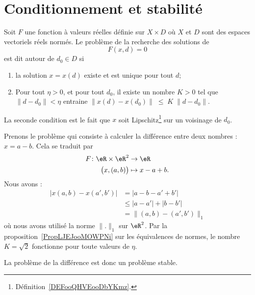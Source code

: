 \section{Conditionnement et stabilité}

\begin{definition}      \label{DEFooYIFAooSJbMkC}
	Soit \( F\) une fonction à valeurs réelles définie sur \( X\times D\) où \( X\) et \( D\) sont des espaces vectoriels réels normés. Le problème de la recherche des solutions de
	\begin{equation}
		F(x,d)=0
	\end{equation}
	est dit  autour de \( d_0\in D\) si
	\begin{enumerate}
		\item
		      la solution \( x=x(d)\) existe et est unique pour tout \( d\);
		\item \label{ItemProbStableB}
		      Pour tout \( \eta>0\), et pour tout \( d_0\), il existe un nombre \( K>0\) tel que \( \| d-d_0\|<\eta\) entraine \( \|x(d)-x(d_0)\|\;\leq\;K\;\|d-d_0\|\).
	\end{enumerate}
	La seconde condition est le fait que \( x\) soit Lipschitz\footnote{Définition~\ref{DEFooQHVEooDbYKmz}.} sur un voisinage de \( d_0\).
\end{definition}

\begin{example}    \label{ExooXJONooTAYZVc}
	Prenons le problème qui consiste à calculer la différence entre deux nombres : \( x=a-b\). Cela se traduit par
	\begin{equation}
		\begin{aligned}
			F\colon \eR\times \eR^2 & \to \eR        \\
			\big( x,(a,b) \big)     & \mapsto x-a+b.
		\end{aligned}
	\end{equation}
	Nous avons :
	\begin{subequations}
		\begin{align}
			\big| x(a,b)-x(a',b') \big| & =| a-b-a'+b' |           \\
			                            & \leq| a-a' |+| b-b' |    \\
			                            & =\|  (a,b)-(a',b')  \|_1
		\end{align}
	\end{subequations}
	où nous avons utilisé la norme \( \| . \|_1\) sur \( \eR^2\). Par la proposition~\ref{PropLJEJooMOWPNi} sur les équivalences de normes, le nombre \( K=\sqrt{2}\) fonctionne pour toute valeurs de \( \eta\).

	La problème de la différence est donc un problème stable.
\end{example}

